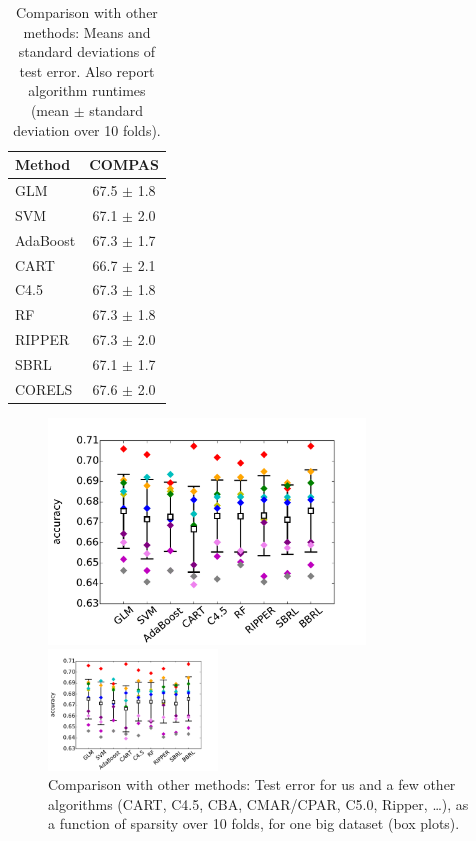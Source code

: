 \begin{arxiv}
\begin{table}[t]
\centering
\begin{tabular}{l | c}
Method & COMPAS \\
\hline
GLM & 67.5 $\pm$ 1.8 \\
SVM & 67.1 $\pm$ 2.0 \\
AdaBoost & 67.3 $\pm$ 1.7 \\
CART & 66.7 $\pm$ 2.1 \\
C4.5 & 67.3 $\pm$ 1.8 \\
RF & 67.3 $\pm$ 1.8 \\
RIPPER & 67.3 $\pm$ 2.0 \\
SBRL & 67.1 $\pm$ 1.7 \\
CORELS & 67.6 $\pm$ 2.0 \\
\end{tabular}
\vspace{2mm}
\caption{Comparison with other methods:
Means and standard deviations of test error.
Also report algorithm runtimes (mean $\pm$ standard deviation over 10 folds).}
\label{tab:comparison}
\end{table}
\end{arxiv}

\begin{figure}[t!]
\begin{center}
\begin{arxiv}
\includegraphics[width=0.75\textwidth]{figs/compare-compas.pdf}
\end{arxiv}
\begin{kdd}
\includegraphics[width=0.4\textwidth]{figs/compare-compas.pdf}
\end{kdd}
\end{center}
\caption{Comparison with other methods:
Test error for us and a few other algorithms
(CART, C4.5, CBA, CMAR/CPAR, C5.0, Ripper, \dots),
as a function of sparsity over 10 folds, for one big dataset (box plots).}
\label{fig:comparison}
\end{figure}

